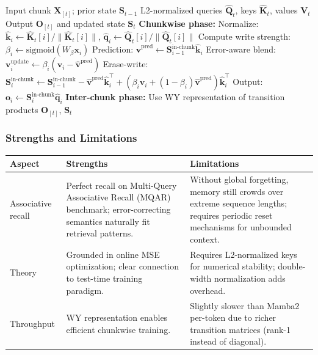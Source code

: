\documentclass[11pt,a4paper]{article}
\begin{document}
\begin{algorithm}[H]
\caption{DeltaNet State Update with WY Representation}
\begin{algorithmic}[1]
\Require Input chunk $\mathbf{X}_{[t]}$; prior state $\mathbf{S}_{t-1}$
\Require L2-normalized queries $\hat{\mathbf{Q}}_t$, keys $\hat{\mathbf{K}}_t$, values $\mathbf{V}_t$
\Ensure Output $\mathbf{O}_{[t]}$ and updated state $\mathbf{S}_t$
\State \textbf{Chunkwise phase:}
    \State Normalize: $\hat{\mathbf{k}}_i \gets \hat{\mathbf{K}}_t[i] / \|\hat{\mathbf{K}}_t[i]\|$, $\hat{\mathbf{q}}_i \gets \hat{\mathbf{Q}}_t[i] / \|\hat{\mathbf{Q}}_t[i]\|$
    \State Compute write strength: $\beta_i \gets \text{sigmoid}(W_\beta \mathbf{x}_i)$
    \State Prediction: $\hat{\mathbf{v}}^\text{pred} \gets \mathbf{S}_{i-1}^\text{in-chunk} \hat{\mathbf{k}}_i$
    \State Error-aware blend: $\mathbf{v}_i^\text{update} \gets \beta_i(\mathbf{v}_i - \hat{\mathbf{v}}^\text{pred})$
    \State Erase-write: $\mathbf{S}_i^\text{in-chunk} \gets \mathbf{S}_{i-1}^\text{in-chunk} - \hat{\mathbf{v}}^\text{pred}\hat{\mathbf{k}}_i^\top + (\beta_i \mathbf{v}_i + (1-\beta_i)\hat{\mathbf{v}}^\text{pred})\hat{\mathbf{k}}_i^\top$
    \State Output: $\mathbf{o}_i \gets \mathbf{S}_i^\text{in-chunk} \hat{\mathbf{q}}_i$
\EndFor
\State \textbf{Inter-chunk phase:} Use WY representation of transition products
\Return $\mathbf{O}_{[t]}$, $\mathbf{S}_{t}$
\end{algorithmic}
\end{algorithm}

\subsubsection{Strengths and Limitations}

\begin{table}[H]
\centering
\small
\begin{tabularx}{0.95\linewidth}{Xp{4cm}p{4cm}}
\toprule
\textbf{Aspect} & \textbf{Strengths} & \textbf{Limitations} \\
\midrule
Associative recall & Perfect recall on Multi-Query Associative Recall (MQAR) benchmark; error-correcting semantics naturally fit retrieval patterns. & Without global forgetting, memory still crowds over extreme sequence lengths; requires periodic reset mechanisms for unbounded context. \\
Theory & Grounded in online MSE optimization; clear connection to test-time training paradigm. & Requires L2-normalized keys for numerical stability; double-width normalization adds overhead. \\
Throughput & WY representation enables efficient chunkwise training. & Slightly slower than Mamba2 per-token due to richer transition matrices (rank-1 instead of diagonal). \\
\bottomrule
\end{tabularx}
\end{table}
\end{document}
